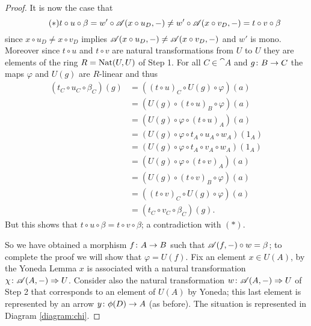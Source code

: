 \begin{proof}
  It is now the case that
  \begin{equation*}
    \tag{\(*\)}
    t\circ u\circ\beta = w'\circ{\mathscr A}(x\circ u_D,-) \not= w'\circ{\mathscr A}(x\circ v_D,-) = t\circ v\circ\beta
  \end{equation*}
  since \(x\circ u_D\not= x\circ v_D\) implies \({\mathscr A}(x\circ u_D,-)\not={\mathscr A}(x\circ v_D,-)\) and \(w'\) is mono. Moreover since \(t\circ u\) and \(t\circ v\) are natural transformations from \(U\) to \(U\) they are elements of the ring \(R = \text{\normalfont Nat}(U,U)\) of Step 1. For all \(C\in\cat{A}\) and \(g\colon B\to C\) the maps \(\varphi\) and \(U(g)\) are \(R\)-linear and thus
  \begin{align*}
    (t_C\circ u_C\circ \beta_C)(g) &= ((t\circ u)_C\circ U(g)\circ\varphi)(a)\\
                                   &= (U(g)\circ(t\circ u)_B\circ\varphi)(a)\\
                                   &= (U(g)\circ\varphi\circ(t\circ u)_A)(a)\\
                                   &= (U(g)\circ\varphi\circ t_A\circ u_A\circ w_A)(1_A)\\
                                   &= (U(g)\circ\varphi\circ t_A\circ v_A\circ w_A)(1_A)\\
                                   &= (U(g)\circ\varphi\circ (t\circ v)_A)(a)\\
                                   &= (U(g)\circ(t\circ v)_B\circ\varphi)(a)\\
                                   &= ((t\circ v)_C\circ U(g)\circ\varphi)(a)\\
                                   &= (t_C\circ v_C\circ \beta_C)(g).
  \end{align*}
  But this shows that \(t\circ u\circ \beta = t\circ v\circ \beta\); a contradiction with \((*)\).

  So we have obtained a morphism \(f\colon A\to B\) such that \({\mathscr A}(f,-)\circ w = \beta\); to complete the proof we will show that \(\varphi = U(f)\). Fix an element \(x\in U(A)\), by the Yoneda Lemma \(x\) is associated with a natural transformation \(\chi\colon {\mathscr A}(A,-)\Rightarrow U\). Consider also the natural transformation \(w\colon {\mathscr A}(A,-)\Rightarrow U\) of Step 2 that corresponds to an element of \(U(A)\) by Yoneda; this last element is represented by an arrow \(y\colon \phi(D)\to A\) (as before). The situation is represented in Diagram \ref{diagram:chi}.


\end{proof}
